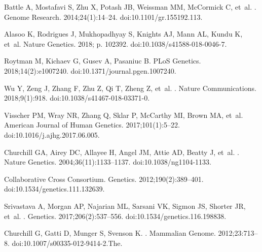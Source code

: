 \documentclass[10pt,letterpaper]{article}
\begin{document}
\begin{thebibliography}{10}
Battle A, Mostafavi S, Zhu X, Potash JB, Weissman MM, McCormick C, et~al.
.
\newblock Genome Research. 2014;24(1):14--24.
\newblock doi:{10.1101/gr.155192.113}.

Alasoo K, Rodrigues J, Mukhopadhyay S, Knights AJ, Mann AL, Kundu K, et~al.
\newblock Nature Genetics. 2018; p. 102392.
\newblock doi:{10.1038/s41588-018-0046-7}.

Roytman M, Kichaev G, Gusev A, Pasaniuc B.
\newblock PLoS Genetics. 2018;14(2):e1007240.
\newblock doi:{10.1371/journal.pgen.1007240}.

Wu Y, Zeng J, Zhang F, Zhu Z, Qi T, Zheng Z, et~al.
.
\newblock Nature Communications. 2018;9(1):918.
\newblock doi:{10.1038/s41467-018-03371-0}.

Visscher PM, Wray NR, Zhang Q, Sklar P, McCarthy MI, Brown MA, et~al.
\newblock American Journal of Human Genetics. 2017;101(1):5--22.
\newblock doi:{10.1016/j.ajhg.2017.06.005}.

Churchill GA, Airey DC, Allayee H, Angel JM, Attie AD, Beatty J, et~al.
.
\newblock Nature Genetics. 2004;36(11):1133--1137.
\newblock doi:{10.1038/ng1104-1133}.

{Collaborative Cross Consortium}.
\newblock Genetics. 2012;190(2):389--401.
\newblock doi:{10.1534/genetics.111.132639}.

Srivastava A, Morgan AP, Najarian ML, Sarsani VK, Sigmon JS, Shorter JR, et~al.
.
\newblock Genetics. 2017;206(2):537--556.
\newblock doi:{10.1534/genetics.116.198838}.

Churchill G, Gatti D, Munger S, Svenson K.
.
\newblock Mammalian Genome. 2012;23:713--8.
\newblock doi:{10.1007/s00335-012-9414-2.The}.


\end{thebibliography}
\end{document}

